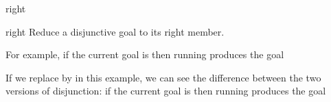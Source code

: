 \begin{tactic}{right}
  \begin{tsyntax}[empty]{right}
  Reduce a disjunctive goal to its right member.

  For example, if the current goal is
   then
  running 
  produces the goal

  If we replace \ec{\\/} by \ec{||} in this example, we can see the
  difference between the two versions of disjunction:
  if the current goal is
   then
  running 
  produces the goal
  \end{tsyntax}
\end{tactic}
